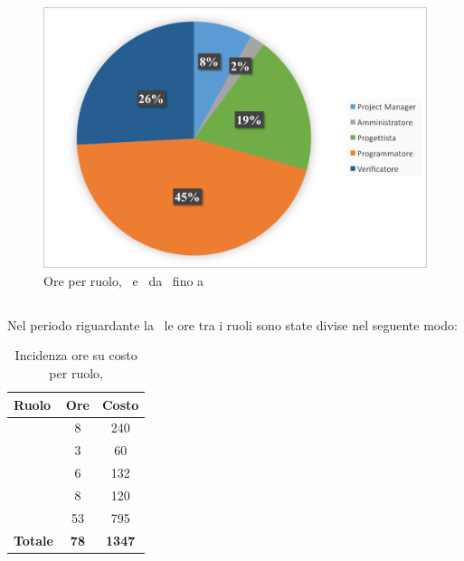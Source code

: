 \begin{figure}[H]
	\centering 
	\includegraphics[scale=0.7]{Immagini/GraficiTorteSezione6/COD.png}
	\caption{Ore per ruolo, \PD\ e \COD\ da \RP\ fino a \RQ}
\end{figure}

\newpage
\subsection{\VV}
Nel periodo riguardante la \VV\ le ore tra i ruoli sono state divise nel seguente modo:

\begin{table}[h]
	\begin{center}
		\begin{tabular}{|l|c|c|}
			\hline
			\textbf{Ruolo}	& \textbf{Ore} &	\textbf{Costo}	 \\
			\hline
			\textit{\Pm}	&	8	&	240		\\
			\hline
			\textit{\Am}	&	3	&	60		\\
			\hline
			\textit{\Prog}	&	6	&	132	\\
			\hline
			\textit{\Progr}	&	8	&	120	\\
			\hline
			\textit{\Ver}	&	53	&	795	\\
			\hline
			\textbf{Totale}	&	\textbf{78}	&	\textbf{1347}	\\
			\hline
		\end{tabular}
	\end{center}
	\caption{Incidenza ore su costo per ruolo, \VV}
\end{table}

